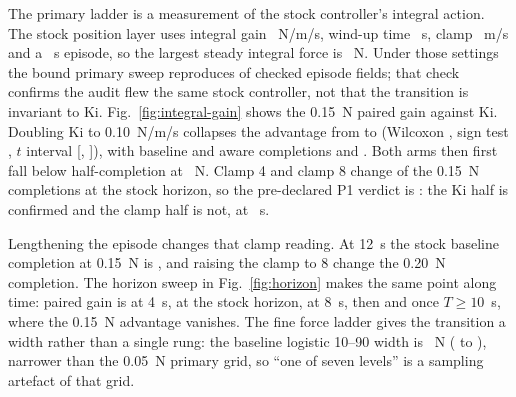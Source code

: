 The primary ladder is a measurement of the stock controller's integral
action. The stock position layer uses integral gain \StockKi{}~N/m/s,
wind-up time \IntegralTauS{}~s, clamp \IntegralClampXy{}~m/s and a
\EpisodeHorizonS{}~s episode, so the largest steady integral force is
\MaxSteadyIntegralForceN{}~N. Under those settings the bound primary sweep
reproduces \AuditStockMatch{} of \AuditStockMatch{} checked episode fields;
that check confirms the audit flew the same stock controller, not that the
transition is invariant to Ki. Fig.~\ref{fig:integral-gain} shows the
0.15~N paired gain against Ki. Doubling Ki to 0.10~N/m/s collapses the
advantage from \AuditStockGain{} to \AuditKiTenGain{} (Wilcoxon
\AuditKiTenWilcoxonP{}, sign test \AuditKiTenSignP{}, $t$ interval
[\AuditKiTenCiLo{}, \AuditKiTenCiHi{}]), with baseline and aware completions
\AuditKiTenBase{} and \AuditKiTenAware{}. Both arms then first fall below
half-completion at \AuditKiTenKnee{}~N. Clamp 4 and clamp 8 change
\AuditClampChanged{} of the 0.15~N completions at the stock horizon, so the
pre-declared P1 verdict is \AuditPOneOverall{}: the Ki half is confirmed and
the clamp half is not, at \EpisodeHorizonS{}~s.

Lengthening the episode changes that clamp reading. At 12~s the stock
baseline completion at 0.15~N is \AuditAOneBTwelveBase{}, and raising the
clamp to 8 \AuditClampMattersLongHorizon{} change the 0.20~N completion. The
horizon sweep in Fig.~\ref{fig:horizon} makes the same point along time:
paired gain is \AuditGainTFour{} at 4~s, \AuditGainTSix{} at the stock
horizon, \AuditGainTEight{} at 8~s, then \AuditGainTTen{} and
\AuditGainTTwelve{} once $T\ge 10$~s, where the 0.15~N advantage vanishes.
The fine force ladder gives the transition a width rather than a single
rung: the baseline logistic 10--90 width is \AuditWidthTenNinety{}~N
(\AuditWidthCiLo{} to \AuditWidthCiHi{}), narrower than the 0.05~N primary
grid, so ``one of seven levels'' is a sampling artefact of that grid.

